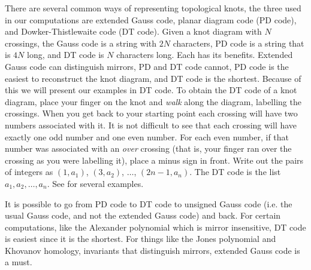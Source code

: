 \documentclass{article}
\theoremstyle{plain}
\begin{document}
        \par\hfill\par
        There are several common ways of representing topological knots, the
        three used in our computations are extended Gauss code, planar diagram
        code (PD code), and Dowker-Thistlewaite code (DT code). Given a knot
        diagram with $N$ crossings, the Gauss code is a string with $2N$
        characters, PD code is a string that is $4N$ long, and DT code is $N$
        characters long. Each has its benefits. Extended Gauss code can
        distinguish mirrors, PD and DT code cannot, PD code is the easiest to
        reconstruct the knot diagram, and DT code is the shortest. Because of
        this we will present our examples in DT code. To obtain the DT code of
        a knot diagram, place your finger on the knot and \textit{walk} along
        the diagram, labelling the crossings. When you get back to your starting
        point each crossing will have two numbers associated with it. It is
        not difficult to see that each crossing will have exactly one odd number
        and one even number. For each even number, if that number was associated
        with an \textit{over} crossing (that is, your finger ran over the
        crossing as you were labelling it), place a minus sign in front. Write
        out the pairs of integers as $(1,a_{1})$, $(3,a_{2})$, $\dots$,
        $(2n-1,a_{n})$. The DT code is the list $a_{1},a_{2},\dots,a_{n}$.
        See \cite{KatlasDTCode} for several examples.
        \par\hfill\par
        It is possible to go from PD code to DT code to unsigned
        Gauss code (i.e. the usual Gauss code, and not the extended Gauss code)
        and back. For certain computations, like the Alexander polynomial which
        is mirror insensitive, DT code is easiest since it is the shortest.
        For things like the Jones polynomial and Khovanov homology, invariants
        that distinguish mirrors, extended Gauss code is a must.
\end{document}
